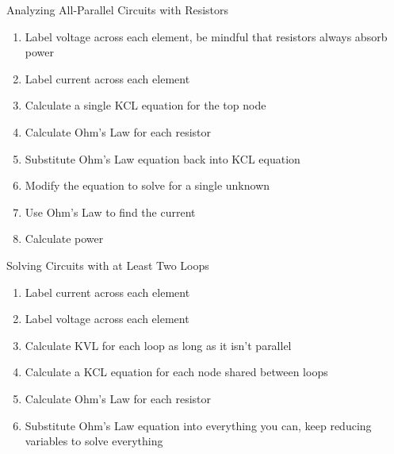 \documentclass{article}
\begin{document}
\noindent
\Large
Analyzing All-Parallel Circuits with Resistors\\
\normalsize
\begin{enumerate}
  \item Label voltage across each element, be mindful that resistors always absorb power
  \item Label current across each element
  \item Calculate a single KCL equation for the top node
  \item Calculate Ohm's Law for each resistor
  \item Substitute Ohm's Law equation back into KCL equation
  \item Modify the equation to solve for a single unknown
  \item Use Ohm's Law to find the current
  \item Calculate power
\end{enumerate}

\noindent
\Large
Solving Circuits with at Least Two Loops\\
\normalsize
\begin{enumerate}
  \item Label current across each element
  \item Label voltage across each element
  \item Calculate KVL for each loop as long as it isn't parallel
  \item Calculate a KCL equation for each node shared between loops
  \item Calculate Ohm's Law for each resistor
  \item Substitute Ohm's Law equation into everything you can, keep reducing variables to solve everything
\end{enumerate}
\end{document}

